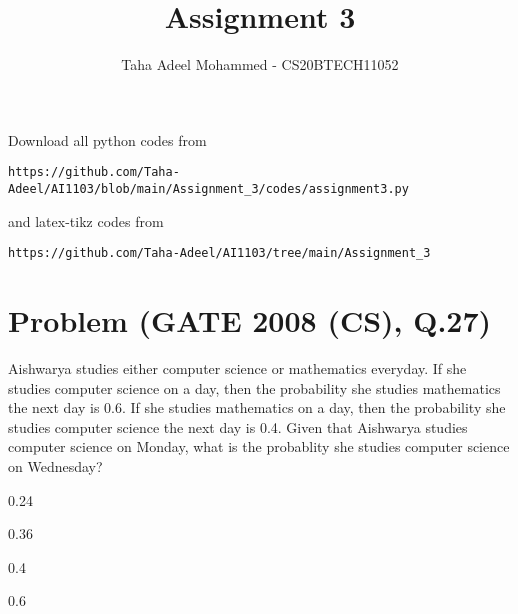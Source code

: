 \documentclass[journal,12pt,twocolumn]{IEEEtran}
\begin{document}
     \def\rightbox#1{\makebox[0in][r]{#1}}
     \def\centbox#1{\makebox[0in]{#1}}
     \def\topbox#1{\raisebox{-\baselineskip}[0in][0in]{#1}}
     \def\midbox#1{\raisebox{-0.5\baselineskip}[0in][0in]{#1}}
\vspace{3cm}
\title{Assignment 3}
\author{Taha Adeel Mohammed - CS20BTECH11052}
\maketitle
\newpage
\bigskip
\renewcommand{\thefigure}{\theenumi}
\renewcommand{\thetable}{\theenumi}
Download all python codes from 
\begin{lstlisting}
https://github.com/Taha-Adeel/AI1103/blob/main/Assignment_3/codes/assignment3.py
\end{lstlisting}
%
and latex-tikz codes from 
%
\begin{lstlisting}
https://github.com/Taha-Adeel/AI1103/tree/main/Assignment_3
\end{lstlisting}
\section{Problem (GATE 2008 (CS), Q.27)}
Aishwarya studies either computer science or mathematics everyday. If she studies computer science on a day, then the probability she studies mathematics the next day is 0.6. If she studies mathematics on a day, then the probability she studies computer science the next day is 0.4.
Given that Aishwarya studies computer science on Monday, what is the probablity she studies computer science on Wednesday?
\begin{enumerate}[label=(\Alph*)]
\begin{multicols}{2}
\item 0.24
\item 0.36
\item 0.4
\item 0.6
\end{multicols}
\end{enumerate}
\end{document}
